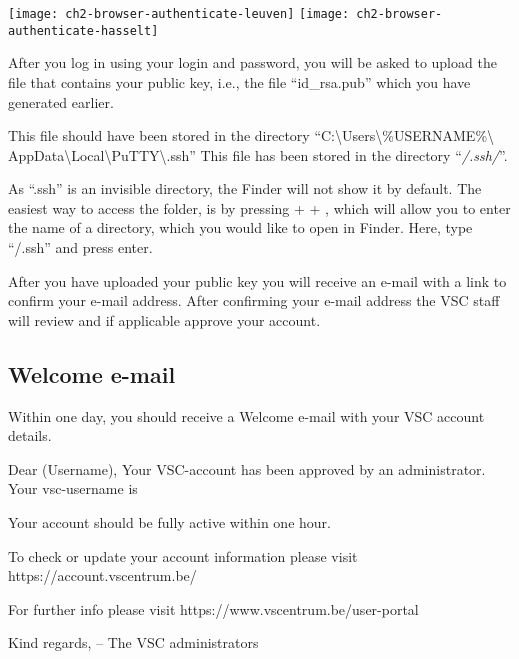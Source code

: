  \begin{center}
  \texttt{[image: ch2-browser-authenticate-leuven]}
  \texttt{[image: ch2-browser-authenticate-hasselt]}
  \end{center}


\fi


After you log in using your \university login and password,
you will be asked to upload the file that contains
your public key, i.e., the file ``id\_rsa.pub'' which you have
generated earlier.

\ifwindows
  This file should have been stored in the directory
  ``C:\textbackslash Users\textbackslash \%USERNAME\%\textbackslash
  AppData\textbackslash Local\textbackslash PuTTY\textbackslash .ssh''
\fi
\ifmacORlinux
  This file has been stored in the directory ``\emph{\tilde/.ssh/}''.
\fi

\ifmac
\begin{tip}
  As ``.ssh'' is an invisible directory, the Finder will
  not show it by default. The easiest way to access the folder, is by pressing
   +  + , which will allow you to enter the name of a directory, which
  you would like to open in Finder. Here, type ``\tilde/.ssh'' and press enter.
\end{tip}
\fi

After you have uploaded your public key you will receive an e-mail with a link to
confirm your e-mail address. After confirming your e-mail address the VSC staff will
review and if applicable approve your account.

\subsection{Welcome e-mail}
\label{sec:welcome-email}

Within one day, you should receive a Welcome e-mail with your VSC account details.

\begin{flattext}
Dear (Username),
Your VSC-account has been approved by an administrator.
Your vsc-username is %

Your account should be fully active within one hour.

To check or update your account information please visit
https://account.vscentrum.be/

For further info please visit https://www.vscentrum.be/user-portal

Kind regards,
-- The VSC administrators
\end{flattext}

